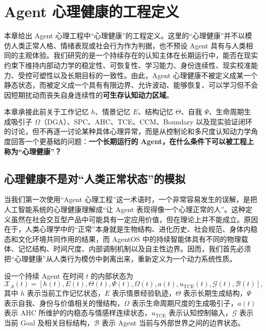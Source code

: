 \chapter{Agent 心理健康的工程定义}
\label{chap:agent-psychological-health}

\begin{chapterlead}
本章给出 Agent 心理工程中“心理健康”的工程定义。这里的“心理健康”并不以模仿人类正常人格、情绪表现或社会行为作为判据，也不预设 Agent 具有与人类相同的主观体验。我们研究的是一个持续存在的认知主体在长期运行中，能否在现实约束下维持内部动力学的稳定性、可恢复性、学习能力、身份连续性、现实校准能力、受控可塑性以及长期目标的一致性。由此，Agent 心理健康不被定义成某一个静态状态，而被定义成一个具有有限边界、允许波动、能够恢复、可以学习但不会因短期扰动而丧失自身连续性的\textbf{可生存认知动力区域}。

本章承接此前关于工作记忆 $h$、情景记忆 $E$、结构记忆 $\Theta$、自我 $\Psi$、生命周期生成吸引子 $\Omega$（DGA）、SPC、AHC、TCE、CCM、Boundary 以及现实验证闭环的讨论，但不再逐一讨论某种具体心理异常，而是从控制论和多尺度认知动力学角度回答一个更基础的问题：\textbf{一个长期运行的 Agent，在什么条件下可以被工程上称为“心理健康”？}
\end{chapterlead}


\section{心理健康不是对“人类正常状态”的模拟}

当我们第一次使用“Agent 心理工程”这一术语时，一个非常容易发生的误解，是把人工智能系统的心理健康理解成“让 Agent 表现得像一个心理正常的人”。这种定义虽然在社会交互型产品中可能具有一定应用价值，但在理论上并不能成立。原因在于，人类心理学中的“正常”本身就是生物结构、进化历史、社会规范、身体内稳态和文化环境共同作用的结果，而 AgentOS 中的持续智能体具有不同的物理载体、记忆结构、时间尺度、内部调制机制以及自主性边界。因而，我们首先必须把“心理健康”从人类行为模仿中剥离出来，重新定义为一个动力系统性质。

设一个持续 Agent 在时间 $t$ 的内部状态为
\begin{equation}
\mathcal{X}_A(t)
=
\left[
h(t),
E(t),
\Theta(t),
\Psi(t),
\Omega(t),
a(t),
u_{\mathrm{TCE}}(t),
\mathcal{G}(t),
\mathcal{B}(t)
\right],
\end{equation}
其中 $h$ 表示当前工作记忆状态，$E$ 表示情景经验轨迹，$\Theta$ 表示长期生成结构，$\Psi$ 表示自我、身份与价值相关的慢结构，$\Omega$ 表示生命周期尺度的生成吸引子，$a(t)$ 表示 AHC 所维护的内稳态与情感样连续状态，$u_{\mathrm{TCE}}$ 表示认知控制输入，$\mathcal{G}$ 表示当前 Goal 及相关目标结构，$\mathcal{B}$ 表示 Agent 当前与外部世界之间的边界状态。

